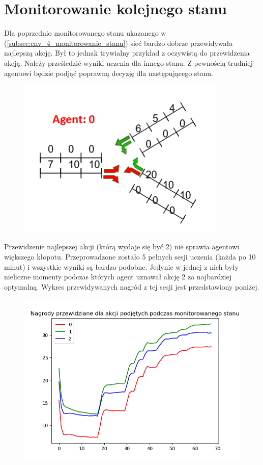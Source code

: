 \documentclass[12pt]{book}
\theoremstyle{plain}
\begin{document}
\section{Monitorowanie kolejnego stanu}	
	Dla poprzednio monitorowanego stanu ukazanego w (\ref{subsec:env_4_monitorowanie_stanu}) sieć bardzo dobrze przewidywała najlepszą akcję. Był to jednak trywialny przykład z oczywistą do przewidzenia akcją. Należy prześledzić wyniki uczenia dla innego stanu. Z pewnością trudniej agentowi będzie podjąć poprawną decyzję dla następującego stanu. 
	\begin{figure}[H]
		\centering
		\includegraphics[width=10cm]{env_4_monitorowany_stan_2.png}
		\label{fig:env_4_monitorowany_stan_2.png}
	\end{figure}
	
	Przewidzenie najlepszej akcji (którą wydaje się być 2) nie sprawia agentowi większego kłopotu. Przeprowadzone zostało 5 pełnych sesji uczenia (każda po 10 minut) i wszystkie wyniki są bardzo podobne. Jedynie w jednej z nich były nieliczne momenty podczas których agent uznawał akcję 2 za najbardziej optymalną. Wykres przewidywanych nagród z tej sesji jest przedstawiony poniżej.  
	\begin{figure}[H]
		\includegraphics[width=20cm]{env_4_monitorowany_stan_2_ucz.png}
		\label{fig:env_4_monitorowany_stan_2_ucz.png}
	\end{figure}
\end{document}

